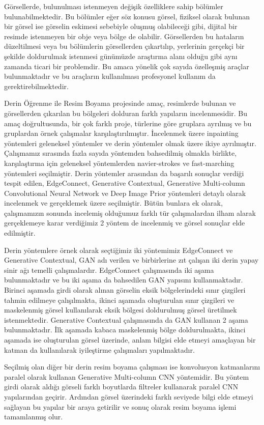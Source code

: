 Görsellerde, bulunulması istenmeyen değişik özelliklere sahip bölümler bulunabilmektedir. Bu bölümler eğer söz konusu görsel, fiziksel olarak bulunan bir görsel ise görselin eskimesi sebebiyle oluşmuş olabileceği gibi, dijital bir resimde istenmeyen bir obje veya bölge de olabilir. Görsellerden bu hataların düzeltilmesi veya bu bölümlerin görsellerden çıkartılıp, yerlerinin gerçekçi bir şekilde doldurulmak istenmesi günümüzde araştırma alanı olduğu gibi aynı zamanda ticari bir problemdir. Bu amaca yönelik çok sayıda özelleşmiş araçlar bulunmaktadır ve bu araçların kullanılması profesyonel kullanım da gerektirebilmektedir.

Derin Öğrenme ile Resim Boyama projesinde amaç, resimlerde bulunan ve görsellerden çıkarılan bu bölgeleri dolduran farklı yapıların incelenmesidir. Bu amaç doğrultusunda, bir çok farklı proje, türlerine göre gruplara ayrılmış ve bu gruplardan örnek çalışmalar karşılaştırılmıştır. İncelenmek üzere inpainting yöntemleri geleneksel yöntemler ve derin yöntemler olmak üzere ikiye ayrılmıştır. Çalışmamız sırasında fazla sayıda yöntemden bahsedilmiş olmakla birlikte, karşılaştırma için geleneksel yöntemlerden navier-strokes ve fast-marching yöntemleri seçilmiştir. Derin yöntemler arasından da başarılı sonuçlar verdiği tespit edilen, EdgeConnect, Generative Contextual, Generative Multi-column Convolutional Neural Network ve Deep Image Prior yöntemleri detaylı olarak incelenmek ve gerçeklemek üzere seçilmiştir. Bütün bunlara ek olarak, çalışmamızın sonunda incelemiş olduğumuz farklı tür çalışmalardan ilham alarak gerçeklemeye karar verdiğimiz 2 yöntem de incelenmiş ve görsel sonuçlar elde edilmiştir.

Derin yöntemlere örnek olarak seçtiğimiz iki yöntemimiz EdgeConnect ve Generative Contextual, GAN adı verilen ve birbirlerine zıt çalışan iki derin yapay sinir ağı temelli çalışmalardır. EdgeConnect çalışmasında iki aşama bulunmaktadır ve bu iki aşama da bahsedilen GAN yapısını kullanmaktadır. Birinci aşamada girdi olarak alınan görselin eksik bölgelerindeki sınır çizgileri tahmin edilmeye çalışılmakta, ikinci aşamada oluşturulan sınır çizgileri ve maskelenmiş görsel kullanılarak eksik bölgesi doldurulmuş görsel üretilmek istenmektedir. Generative Contextual çalışmasında da GAN kullanan 2 aşama bulunmaktadır. İlk aşamada kabaca maskelenmiş bölge doldurulmakta, ikinci aşamada ise oluşturulan görsel üzerinde, anlam bilgisi elde etmeyi amaçlayan bir katman da kullanılarak iyileştirme çalışmaları yapılmaktadır.

Seçilmiş olan diğer bir derin resim boyama çalışması ise konvolusyon katmanlarını paralel olarak kullanan Generative Multi-column CNN yöntemidir. Bu yöntem girdi olarak aldığı görseli farklı boyutlarda filtreler kullanarak paralel CNN yapılarından geçirir. Ardından görsel üzerindeki farklı seviyede bilgi elde etmeyi sağlayan bu yapılar bir araya getirilir ve sonuç olarak resim boyama işlemi tamamlanmış olur.

